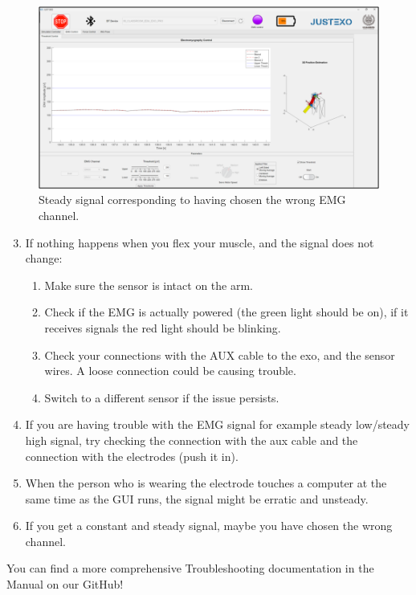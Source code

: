 \begin{figure}[H]
	\centering
	\includegraphics[width=0.7\linewidth]{img/fig_23}
	\caption{Steady signal corresponding to having chosen the wrong EMG channel. }
	\label{fig:fig23}
\end{figure}

\begin{enumerate}[]
	\setcounter{enumi}{2}
	\item If nothing happens when you flex your muscle, and the signal does not change: 
	\begin{enumerate}[]
		\item Make sure the sensor is intact on the arm. 
		\item Check if the EMG is actually powered (the green light should be on), if it receives signals the red light should be blinking. 
		\item Check your connections with the AUX cable to the exo, and the sensor wires. A loose connection could be causing trouble. 
		\item Switch to a different sensor if the issue persists. 
	\end{enumerate}
	\item If you are having trouble with the EMG signal for example steady low/steady high signal, try checking the connection with the aux cable and the connection with the electrodes (push it in). 
	\item When the person who is wearing the electrode touches a computer at the same time as the GUI runs, the signal might be erratic and unsteady. 
	\item If you get a constant and steady signal, maybe you have chosen the wrong channel.
\end{enumerate}

\begin{tcolorbox}[colback=green!5!white,colframe=green!75!black,title=Hint]
	You can find a more comprehensive Troubleshooting documentation in the Manual on our GitHub!
\end{tcolorbox}
\vspace{0.5cm}


	




